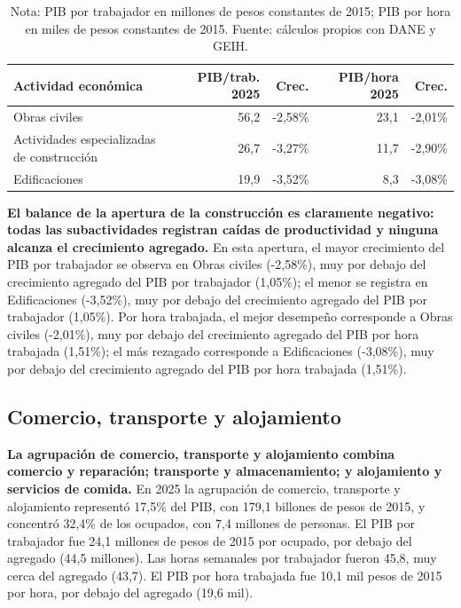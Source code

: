 \begin{table}[H]
\centering
\caption{Productividad laboral de las actividades de construcción, 2010--2025}
\label{tab:sector_f_zoom25}
\small
\begin{tabular}{p{}rrrr}
\toprule
Actividad económica & PIB/trab. 2025 & Crec. & PIB/hora 2025 & Crec. \\
\midrule
Obras civiles & 56,2 & -2,58\% & 23,1 & -2,01\% \\
Actividades especializadas de construcción & 26,7 & -3,27\% & 11,7 & -2,90\% \\
Edificaciones & 19,9 & -3,52\% & 8,3 & -3,08\% \\
\bottomrule
\end{tabular}
\caption*{\footnotesize Nota: PIB por trabajador en millones de pesos constantes de 2015; PIB por hora en miles de pesos constantes de 2015. Fuente: cálculos propios con DANE y GEIH.}
\end{table}

\textbf{El balance de la apertura de la construcción es claramente negativo: todas las subactividades registran caídas de productividad y ninguna alcanza el crecimiento agregado.} En esta apertura, el mayor crecimiento del PIB por trabajador se observa en Obras civiles (-2,58\%), muy por debajo del crecimiento agregado del PIB por trabajador (1,05\%); el menor se registra en Edificaciones (-3,52\%), muy por debajo del crecimiento agregado del PIB por trabajador (1,05\%). Por hora trabajada, el mejor desempeño corresponde a Obras civiles (-2,01\%), muy por debajo del crecimiento agregado del PIB por hora trabajada (1,51\%); el más rezagado corresponde a Edificaciones (-3,08\%), muy por debajo del crecimiento agregado del PIB por hora trabajada (1,51\%).

\subsection{Comercio, transporte y alojamiento}

\textbf{La agrupación de comercio, transporte y alojamiento combina comercio y reparación; transporte y almacenamiento; y alojamiento y servicios de comida.} En 2025 la agrupación de comercio, transporte y alojamiento representó 17,5\% del PIB, con 179,1 billones de pesos de 2015, y concentró 32,4\% de los ocupados, con 7,4 millones de personas. El PIB por trabajador fue 24,1 millones de pesos de 2015 por ocupado, por debajo del agregado (44,5 millones). Las horas semanales por trabajador fueron 45,8, muy cerca del agregado (43,7). El PIB por hora trabajada fue 10,1 mil pesos de 2015 por hora, por debajo del agregado (19,6 mil).

